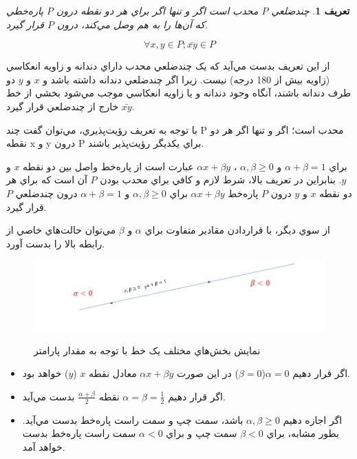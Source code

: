 \documentclass{book}
\newtheorem{defn}[section]{تعریف}
\begin{document}
\begin{defn}
    چندضلعي $P$ محدب است اگر و تنها اگر براي هر دو نقطه درون $P$ پاره‌خطي که آن‌ها را به هم وصل مي‌کند، درون $P$ قرار گيرد.
    
    $$\forall x, y \in P; \bar{xy} \in P$$
\end{defn}


از اين تعريف بدست مي‌آيد که يک چندضلعي محدب داراي دندانه و زاويه انعکاسي (زاويه بيش از 180 درجه) نيست. زيرا اگر چندضلعي دندانه داشته باشد و $x$ و $y$ دو طرف دندانه باشند، آنگاه وجود دندانه و يا زاويه انعکاسي موجب مي‌شود بخشي از خط $\bar{xy}$ خارج از چندضلعي قرار گيرد.

با توجه به تعريف رؤيت‌پذيري، مي‌توان گفت چند P  محدب است؛ اگر و تنها اگر هر دو نقطه x و y درون P براي يکديگر رؤيت‌پذير باشند.

براي
$\alpha+\beta =1$ و $\alpha,\beta \ge 0$ ، $\alpha x + \beta y$
عبارت است از پاره‌خط واصل بين دو نقطه $x$ و $y$. بنابراين در تعريف بالا، شرط لازم و کافي براي محدب بودن $P$ آن است که براي هر دو نقطه
$x$ و $y$
درون $P$ پاره‌خط
$\alpha x + \beta y$
براي
$\alpha,\beta \ge 0$ و $\alpha+\beta =1$
درون چندضلعي $P$ قرار گيرد.

از سوي ديگر، با قراردادن مقادير متفاوت براي $\alpha$ و  $\beta$ مي‌توان حالت‌هاي خاصي از رابطه بالا را بدست آورد.

\begin{figure}[h!]
    \begin{center}
        \includegraphics[width=\linewidth]{line_param.jpg}
        \label{line_param}
        \caption{نمايش بخش‌هاي مختلف يک خط با توجه به مقدار پارامتر}
    \end{center}
\end{figure}

\begin{itemize}
    \item
    اگر قرار دهيم $\alpha=0$($\beta=0$) در اين صورت $\alpha x + \beta y$ معادل نقطه $x$ ($y$) خواهد بود. 
    \item
    اگر قرار دهيم $\alpha=\beta=\frac{1}{2}$ نقطه $\frac{\alpha+\beta}{2}$ بدست مي‌آيد.
    \item
    اگر اجازه دهيم $\alpha,\beta \ge 0$ باشد، سمت چپ و سمت راست پاره‌خط بدست مي‌آيد. بطور مشابه، براي $\beta<0$ سمت چپ و براي $\alpha<0$  سمت راست پاره‌خط بدست خواهد آمد.
\end{itemize}
\end{document}
